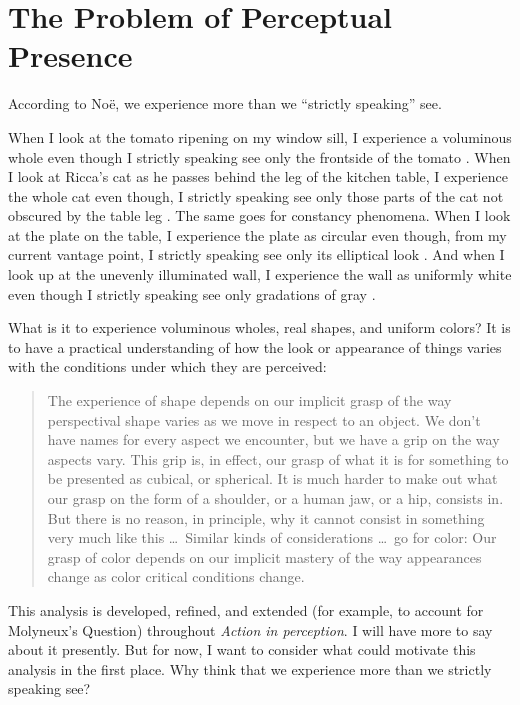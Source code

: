 \documentclass[12pt]{article}
\begin{document}

\section{The Problem of Perceptual Presence}\label{sec:the_problem_of_perceptual_presence} %

According to Noë, we experience more than we ``strictly speaking'' see. 

When I look at the tomato ripening on my window sill, I experience a voluminous whole even though I strictly speaking see only the frontside of the tomato \citep[76]{Noe:2004fk}. When I look at Ricca's cat as he passes behind the leg of the kitchen table, I experience the whole cat even though, I strictly speaking see only those parts of the cat not obscured by the table leg \citep[60]{Noe:2004fk}. The same goes for constancy phenomena. When I look at the plate on the table, I experience the plate as circular even though, from my current vantage point, I strictly speaking see only its elliptical look \citep[78--79]{Noe:2004fk}. And when I look up at the unevenly illuminated wall, I experience the wall as uniformly white even though I strictly speaking see only gradations of gray \citep[127]{Noe:2004fk}. 

What is it to experience voluminous wholes, real shapes, and uniform colors? It is to have a practical understanding of how the look or appearance of things varies with the conditions under which they are perceived:
	\begin{quote}
		The experience of shape depends on our implicit grasp of the way perspectival shape varies as we move in respect to an object. We don’t have names for every aspect we encounter, but we have a grip on the way aspects vary. This grip is, in effect, our grasp of what it is for something to be presented as cubical, or spherical. It is much harder to make out what our grasp on the form of a shoulder, or a human jaw, or a hip, consists in. But there is no reason, in principle, why it cannot consist in something very much like this \ldots\ Similar kinds of considerations \ldots\ go for color: Our grasp of color depends on our implicit mastery of the way appearances change as color critical conditions change. \citep[198--199]{Noe:2004fk}
	\end{quote}
This analysis is developed, refined, and extended (for example, to account for Molyneux's Question) throughout \emph{Action in perception}. I will have more to say about it presently. But for now, I want to consider what could motivate this analysis in the first place. Why think that we experience more than we strictly speaking see?
\end{document}
